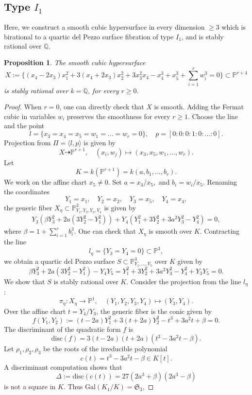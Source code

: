 \documentclass[12pt, reqno]{amsart}
\theoremstyle{plain}
\newtheorem{prop}{Proposition}[section]
\theoremstyle{remark}
\theoremstyle{definition}
\numberwithin{equation}{section}
\def\fS{{\mathfrak S}}
\def\fS{{\mathfrak S}}
\def\bP{{\mathbb P}}
\def\bQ{{\mathbb Q}}
\def\Gal{\mathrm{Gal}}
\begin{document}
\subsection*{Type $I_1$} Here, we construct a smooth cubic hypersurface in every dimension $\ge 3$ which is birational to a quartic del Pezzo surface fibration of type $I_1$, and is stably rational over $\bQ$.
\begin{prop}\label{prop:CubicI1}
The smooth cubic hypersurface 
$$
X:=\{(x_4-2x_3)x_1^2+3(x_4+2x_3)x_2^2+3x_3^2x_4-x_4^3 +x_5^3 +\sum_{i=1}^rw_i^3=0\}\subset\bP^{r+4}
$$
is stably rational over $k=\bQ$, for every $r\geq0$.
\end{prop}
\begin{proof}
When $r=0$, one can  directly check that $X$ is smooth.    Adding the Fermat cubic in variables $w_i$ preserves the smoothness for every $r\geq 1$. 
Choose the line and the point
$$
l=\{x_3=x_4=x_5=w_1=\ldots=w_r=0\}, \quad p=[0:0:0:1:0:\ldots:0].
$$ 
Projection from $\Pi=\langle l,p\rangle$ is given by 
$$
X\dashrightarrow\bP^{r+1},\quad (x_i,w_j)\mapsto (x_3,x_5,w_1,\ldots,w_r).
$$
Let $$K=k(\bP^{r+1})=k(a,b_1,\ldots,b_r).$$ We work on the affine chart $x_5\ne 0$. Set $a={x_3}/{x_5},$ and $b_i={w_i}/{x_5}$. Renaming the coordinates 
$$
Y_1=x_1,\quad Y_2=x_2,\quad Y_3=x_5,\quad Y_4=x_4,
$$
the generic fiber $X_\eta\subset\bP^3_{Y_1,Y_2,Y_3,Y_4}$ is given by
\begin{align}\label{eqn:I1Xeta}
Y_3(\beta Y_3^2+2a(3Y_2^2-Y_1^2))+Y_4(Y_1^2+3Y_2^2+3a^2Y_3^2-Y_4^2)=0,
\end{align}
where 
$\beta=1+\sum_{i=1}^rb_i^3.
$
 One can check that $X_\eta$ is smooth over $K$. Contracting the line 
 $$
 l_\eta=\{Y_3=Y_4=0\}\subset\bP^3,
 $$
 we obtain a quartic del Pezzo surface $S\subset\bP^4_{Y_1,\ldots,Y_5}$ over $K$ given by 
$$
     \beta Y_3^2+2a(3Y_2^2-Y_1^2)-Y_4Y_5=Y_1^2+3Y_2^2+3a^2Y_3^2-Y_4^2+Y_3Y_5=0.
$$
We show that $S$ is stably rational over $K$.
Consider  the projection from the line $l_\eta$:
$$
\pi_\eta:X_\eta\to\bP^1,\quad (Y_1,Y_2,Y_3,Y_4)\mapsto(Y_3,Y_4).
$$ 
Over the affine chart $t={Y_4}/{Y_3}$, the generic fiber is the conic given by 
$$
f(Y_1,Y_2):=(t - 2a)Y_1^2 + 3(t + 2a)Y_2^2 - t^3 + 3a^2t + \beta=0.
$$
The discriminant of the quadratic form $f$ is
$$
\mathrm{disc}(f)=3(t-2a)(t+2a)(t^3-3a^2t-\beta).
$$
Let $\rho_1,\rho_2,\rho_3$ be the roots of the irreducible polynomial $$
c(t) = t^3 - 3a^2t -\beta\in K[t].
$$ 
A discriminant computation shows that
$$
\Delta:=\mathrm{disc}(c(t))=27(2a^3+\beta)(2a^3-\beta)
$$
is not a square in $K$. Thus $\Gal(K_1/K)=\fS_3$, 

\end{proof}
\end{document}
